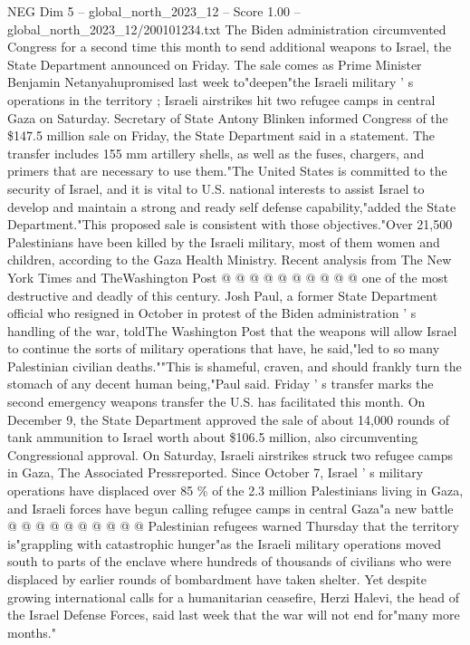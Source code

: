 \begin{textsample}{NEG Dim 5 – global\_north\_2023\_12 – Score 1.00 – global\_north\_2023\_12/200101234.txt}  \label{ex:f5_neg_118}
The Biden administration circumvented Congress for a second time this month to send additional weapons to Israel, the State Department announced on Friday.
The sale comes as Prime Minister Benjamin Netanyahupromised last week to"deepen"the Israeli military ' s operations in the territory ; Israeli airstrikes hit two refugee camps in central Gaza on Saturday.
Secretary of State Antony Blinken informed Congress of the \$147.5 million sale on Friday, the State Department said in a statement.
The transfer includes 155 mm artillery shells, as well as the fuses, chargers, and primers that are necessary to use them."The United States is committed to the security of Israel, and it is vital to U.S. national interests to assist Israel to develop and maintain a strong and ready self defense capability,"added the State Department."This proposed sale is consistent with those objectives."Over 21,500 Palestinians have been killed by the Israeli military, most of them women and children, according to the Gaza Health Ministry.
Recent analysis from The New York Times and TheWashington Post @ @ @ @ @ @ @ @ @ @ one of the most destructive and deadly of this century.
Josh Paul, a former State Department official who resigned in October in protest of the Biden administration ' s handling of the war, toldThe Washington Post that the weapons will allow Israel to continue the sorts of military operations that have, he said,"led to so many Palestinian civilian deaths.""This is shameful, craven, and should frankly turn the stomach of any decent human being,"Paul said.
Friday ' s transfer marks the second emergency weapons transfer the U.S. has facilitated this month.
On December 9, the State Department approved the sale of about 14,000 rounds of tank ammunition to Israel worth about \$106.5 million, also circumventing Congressional approval.
On Saturday, Israeli airstrikes struck two refugee camps in Gaza, The Associated Pressreported.
Since October 7, Israel ' s military operations have displaced over 85 \% of the 2.3 million Palestinians living in Gaza, and Israeli forces have begun calling refugee camps in central Gaza"a new battle @ @ @ @ @ @ @ @ @ @ Palestinian refugees warned Thursday that the territory is"grappling with catastrophic hunger"as the Israeli military operations moved south to parts of the enclave where hundreds of thousands of civilians who were displaced by earlier rounds of bombardment have taken shelter.
Yet despite growing international calls for a humanitarian ceasefire, Herzi Halevi, the head of the Israel Defense Forces, said last week that the war will not end for"many more months."

\end{textsample}
